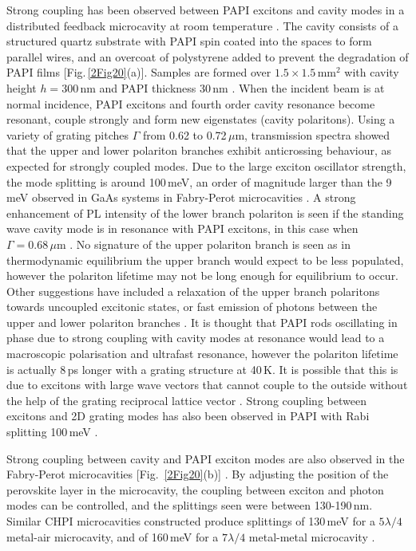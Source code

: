 Strong coupling has been observed between PAPI excitons and cavity modes in a distributed feedback microcavity at room temperature \cite{Fujita1998, Fujita1999, Fujita2000}. The cavity consists of a structured quartz substrate with PAPI spin coated into the spaces to form parallel wires, and an overcoat of polystyrene added to prevent the degradation of PAPI films [Fig.\,\ref{2Fig20}(a)]. Samples are formed over $1.5\times1.5$\,mm$^2$ with cavity height $h = 300$\,nm and PAPI thickness 30\,nm \cite{Fujita1999}. When the incident beam is at normal incidence, PAPI excitons and fourth order cavity resonance become resonant, couple strongly and form new eigenstates (cavity polaritons). Using a variety of grating pitches $\Gamma$ from 0.62 to 0.72\,$\mu$m, transmission spectra showed that the upper and lower polariton branches exhibit anticrossing behaviour, as expected for strongly coupled modes. Due to the large exciton oscillator strength, the mode splitting is around 100\,meV, an order of magnitude larger than the 9\,meV observed in GaAs systems in Fabry-Perot microcavities \cite{Fujita1998}. A strong enhancement of PL intensity of the lower branch polariton is seen if the standing wave cavity mode is in resonance with PAPI excitons, in this case when $\Gamma=0.68\,\mu$m \cite{Fujita1999}. No signature of the upper polariton branch is seen as in thermodynamic equilibrium the upper branch would expect to be less populated, however the polariton lifetime may not be long enough for equilibrium to occur. Other suggestions have included a relaxation of the upper branch polaritons towards uncoupled excitonic states, or fast emission of photons between the upper and lower polariton branches \cite{Lanty2008}. It is thought that PAPI rods oscillating in phase due to strong coupling with cavity modes at resonance would lead to a macroscopic polarisation and ultrafast resonance, however the polariton lifetime is actually 8\,ps longer with a grating structure at 40\,K. It is possible that this is due to excitons with large wave vectors that cannot couple to the outside without the help of the grating reciprocal lattice vector \cite{Fujita2000}. Strong coupling between excitons and 2D grating modes has also been observed in PAPI with Rabi splitting 100\,meV \cite{Ishi-Hayase2003}.

Strong coupling between cavity and PAPI exciton modes are also observed in the Fabry-Perot microcavities [Fig.\ \ref{2Fig20}(b)] \cite{Brehier2006, Lanty2008}. By adjusting the position of the perovskite layer in the microcavity, the coupling between exciton and photon modes can be controlled, and the splittings seen were between 130-190\,nm. Similar CHPI microcavities constructed produce splittings of 130\,meV for a $5\lambda/4$ metal-air microcavity, and of 160\,meV for a $7\lambda/4$ metal-metal microcavity \cite{Pradeesh2009b}.

